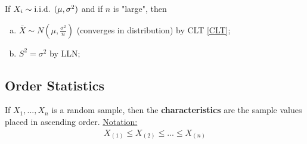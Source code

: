 \documentclass[11pt]{elegantbook}
\begin{document}
\begin{theorem}["Asymptotics"]
    If $X_i\sim \textnormal{i.i.d. } (\mu,\sigma^2)$ and if $n$ is "large", then
    \begin{enumerate}[(a).]
        \item $\bar{X}\sim N(\mu,\frac{\sigma^2}{n})$ (converges in distribution) by CLT \ref{CLT};
        \item $S^2=\sigma^2$ by LLN;
    \end{enumerate}
\end{theorem}

\subsection{Order Statistics}
\begin{definition}
    \normalfont
    If $X_1,...,X_n$ is a random sample, then the \textbf{characteristics} are the sample values placed in ascending order.
    \underline{Notation:}
    \begin{equation}
        \begin{aligned}
            X_{(1)}\leq X_{(2)}\leq ... \leq X_{(n)}
        \end{aligned}
        \nonumber
    \end{equation}
\end{definition}
\end{document}
